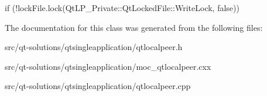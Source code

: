 if (!lockFile.lock(QtLP\_\-Private::QtLockedFile::WriteLock, false)) 



The documentation for this class was generated from the following files:\begin{DoxyCompactItemize}
\item 
src/qt-\/solutions/qtsingleapplication/qtlocalpeer.h\item 
src/qt-\/solutions/qtsingleapplication/moc\_\-qtlocalpeer.cxx\item 
src/qt-\/solutions/qtsingleapplication/qtlocalpeer.cpp\end{DoxyCompactItemize}
